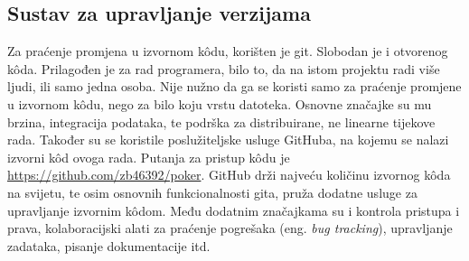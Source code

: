 \subsection{Sustav za upravljanje verzijama}
Za praćenje promjena u izvornom k\^odu, korišten je git. Slobodan je i otvorenog k\^oda. Prilagođen je za rad programera, bilo to, da na istom projektu radi više ljudi, ili samo jedna osoba. Nije nužno da ga se koristi samo za praćenje promjene u izvornom k\^odu, nego za bilo koju vrstu datoteka. Osnovne značajke su mu brzina, integracija podataka, te podrška za distribuirane, ne linearne tijekove rada. Također su se koristile poslužiteljske usluge GitHuba, na kojemu se nalazi izvorni k\^od ovoga rada. Putanja za pristup k\^odu je \url{https://github.com/zb46392/poker}. GitHub drži najveću količinu izvornog k\^oda na svijetu, te osim osnovnih funkcionalnosti gita, pruža dodatne usluge za upravljanje izvornim k\^odom. Među dodatnim značajkama su i kontrola pristupa i prava, kolaboracijski alati za praćenje pogrešaka (eng. \textit{bug tracking}), upravljanje zadataka, pisanje dokumentacije itd.

